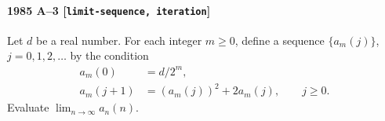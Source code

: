\paragraph{1985 A--3 \textnormal{[\texttt{limit-sequence, iteration}]}}
Let $d$ be a real number. For each integer $m \geq 0$, define a
sequence $\{a_m(j)\}$, $j=0,1,2,\dots$ by the condition
\begin{align*}
a_m(0) &= d/2^m, \\
a_m(j+1) &= (a_m(j))^2 + 2a_m(j), \qquad j \geq 0.
\end{align*}
Evaluate $\lim_{n \to \infty} a_n(n)$.
